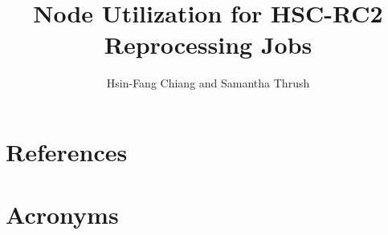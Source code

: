 \documentclass[DM,authoryear,toc]{lsstdoc}
\title{Node Utilization for HSC-RC2 Reprocessing Jobs}
\author{%
Hsin-Fang Chiang and Samantha Thrush
}
\date{\vcsDate}
\begin{document}
\maketitle



\appendix
\section{References} \label{sec:bib}
\renewcommand{\refname}{} %


\section{Acronyms} \label{sec:acronyms}

\end{document}
